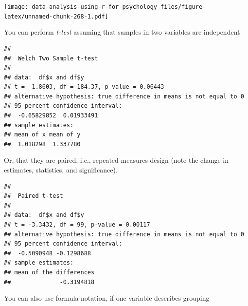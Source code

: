 \documentclass[
]{book}
\newenvironment{Shaded}{\begin{snugshade}}{\end{snugshade}}
\newcommand{\AttributeTok}[1]{\textcolor[rgb]{0.77,0.63,0.00}{#1}}
\newcommand{\ConstantTok}[1]{\textcolor[rgb]{0.00,0.00,0.00}{#1}}
\newcommand{\DecValTok}[1]{\textcolor[rgb]{0.00,0.00,0.81}{#1}}
\newcommand{\FunctionTok}[1]{\textcolor[rgb]{0.00,0.00,0.00}{#1}}
\newcommand{\NormalTok}[1]{#1}
\newcommand{\OtherTok}[1]{\textcolor[rgb]{0.56,0.35,0.01}{#1}}
\newcommand{\SpecialCharTok}[1]{\textcolor[rgb]{0.00,0.00,0.00}{#1}}
\newcommand{\StringTok}[1]{\textcolor[rgb]{0.31,0.60,0.02}{#1}}
\begin{document}
\texttt{[image: data-analysis-using-r-for-psychology\_files/figure-latex/unnamed-chunk-268-1.pdf]}

You can perform \emph{t-test} assuming that samples in two variables are independent

\begin{Shaded}
\end{Shaded}

\begin{verbatim}
## 
##  Welch Two Sample t-test
## 
## data:  df$x and df$y
## t = -1.8603, df = 184.37, p-value = 0.06443
## alternative hypothesis: true difference in means is not equal to 0
## 95 percent confidence interval:
##  -0.65829852  0.01933491
## sample estimates:
## mean of x mean of y 
##  1.018298  1.337780
\end{verbatim}

Or, that they are paired, i.e., repeated-measures design (note the change in estimates, statistics, and significance).

\begin{Shaded}
\end{Shaded}

\begin{verbatim}
## 
##  Paired t-test
## 
## data:  df$x and df$y
## t = -3.3432, df = 99, p-value = 0.00117
## alternative hypothesis: true difference in means is not equal to 0
## 95 percent confidence interval:
##  -0.5090948 -0.1298688
## sample estimates:
## mean of the differences 
##              -0.3194818
\end{verbatim}

You can also use formula notation, if one variable describes grouping

\begin{Shaded}
\end{Shaded}
\end{document}
